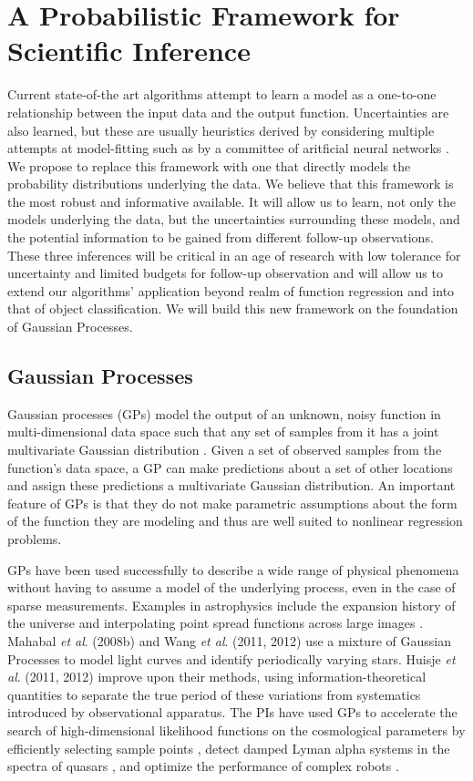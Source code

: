 \documentclass[useAMS,usenatbib,tightenlines,11pt,preprint]{aastex}
\begin{document}
\section{A Probabilistic Framework for Scientific Inference}


Current state-of-the art algorithms attempt to learn a 
model as a one-to-one
relationship between the input data and the output function. Uncertainties are
also learned, but these are usually heuristics derived by considering multiple
attempts at model-fitting such as by a committee of aritficial neural networks
\cite{annz}.  We propose to replace this framework with one that directly models
the probability distributions underlying the data.
We believe that this framework
is the most robust and informative available.  It will allow us
to learn, not only
the models underlying the data, but the uncertainties surrounding these models,
and the potential information to be gained from different follow-up
observations.  These three inferences will be critical in an age of
research with low tolerance for uncertainty and limited budgets for
follow-up observation and will allow us to extend our algorithms' application
beyond realm of function regression and into that of object classification.
We will build this new framework on the foundation of Gaussian Processes.  

\subsection{Gaussian Processes}
\label{sec:gp}


Gaussian processes (GPs) model the output of an unknown, noisy function
in multi-dimensional data space
such that any set of samples from it has a joint multivariate Gaussian
distribution \cite{gp}.  Given a set of observed samples from the function's
data space, a GP
can make predictions about a set of other locations and assign these
predictions a multivariate Gaussian distribution.  An important
feature of GPs is that they do not make parametric assumptions about the
form of the function they are modeling and thus are well suited to
nonlinear regression problems.

GPs have been used successfully to describe a wide range of physical
phenomena without having to assume a model of the underlying process, even
in the case of sparse measurements.  Examples in astrophysics include the
expansion history of the universe \cite{ericgp} and interpolating point
spread functions across large images \cite{psf}.  Mahabal {\it et al}. (2008b) 
and Wang {\it et al}. (2011,
2012) use a mixture of Gaussian Processes to model light curves and
identify periodically varying stars.  Huisje {\it et al}. (2011, 2012)
improve upon their methods, using information-theoretical quantities to
separate the true period of these variations from systematics introduced by
observational apparatus.  The PIs have used GPs to accelerate the search of
high-dimensional likelihood functions on the cosmological parameters by
efficiently selecting sample points \cite{daniel2012}, detect damped Lyman
alpha systems in the spectra of quasars \cite{Garnett12a}, and optimize the
performance of complex robots \cite{Tesch11a,Tesch11b,Tesch13}.
\end{document}
